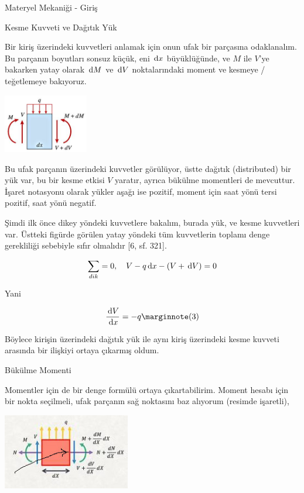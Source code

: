 \documentclass[12pt,fleqn]{article}\usepackage{../../common}
\begin{document}
Materyel Mekaniği - Giriş












Kesme Kuvveti ve Dağıtık Yük

Bir kiriş üzerindeki kuvvetleri anlamak için onun ufak bir parçasına
odaklanalım. Bu parçanın boyutları sonsuz küçük, eni $\,\mathrm{d} x$ büyüklüğünde, ve
$M$ ile $V$'ye bakarken yatay olarak $\,\mathrm{d} M$ ve $\,\mathrm{d} V$ noktalarındaki moment ve
kesmeye / teğetlemeye bakıyoruz.

\includegraphics[width=10em]{phy_020_strs_02_10.jpg}

Bu ufak parçanın üzerindeki kuvvetler görülüyor, üstte dağıtık (distributed) bir
yük var, bu bir kesme etkisi $V$ yaratır, ayrıca bükülme momentleri de
mevcuttur. İşaret notasyonu olarak yükler aşağı ise pozitif, moment için
saat yönü tersi pozitif, saat yönü negatif.

Şimdi ilk önce dikey yöndeki kuvvetlere bakalım, burada yük, ve kesme
kuvvetleri var. Üstteki figürde görülen yatay yöndeki tüm kuvvetlerin toplamı
denge gerekliliği sebebiyle sıfır olmalıdır [6, sf. 321].

$$
\sum_{dik} = 0, \quad V - q \,\mathrm{d} x - (V + \,\mathrm{d} V) = 0
$$

Yani

$$
\frac{\ud V}{\ud x} = -q
\mlabel{3}
$$

Böylece kirişin üzerindeki dağıtık yük ile aynı kiriş üzerindeki kesme
kuvveti arasında bir ilişkiyi ortaya çıkarmış oldum. 

Bükülme Momenti

Momentler için de bir denge formülü ortaya çıkartabilirim. Moment hesabı için
bir nokta seçilmeli, ufak parçanın sağ noktasını baz alıyorum (resimde
işaretli),

\includegraphics[width=15em]{phy_020_strs_02_11.jpg}
\end{document}
